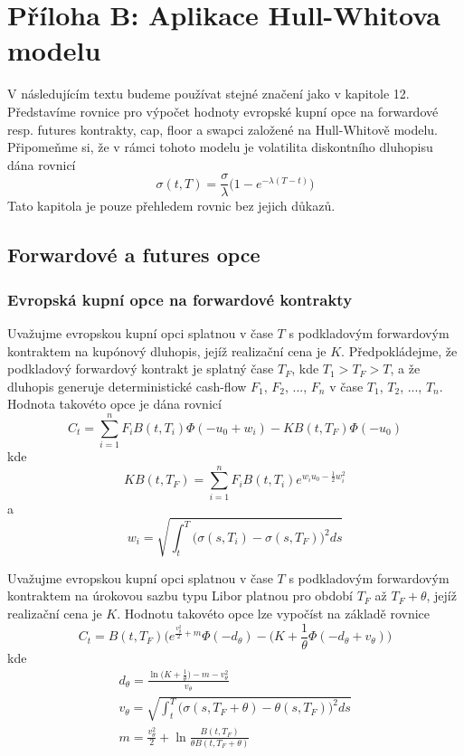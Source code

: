 \documentclass[a4paper]{book}
\begin{document}
\section{Příloha B: Aplikace Hull-Whitova modelu}

V následujícím textu budeme používat stejné značení jako v kapitole 12. Představíme rovnice pro výpočet hodnoty evropské kupní opce na forwardové resp. futures kontrakty, cap, floor a swapci založené na Hull-Whitově modelu. Připomeňme si, že v rámci tohoto modelu je volatilita diskontního dluhopisu dána rovnicí 
\begin{equation*}
\sigma(t,T) = \frac{\sigma}{\lambda} \big( 1 - e^{-\lambda(T-t)}\big)
\end{equation*}
Tato kapitola je pouze přehledem rovnic bez jejich důkazů.

\subsection{Forwardové a futures opce}

\subsubsection{Evropská kupní opce na forwardové kontrakty}

Uvažujme evropskou kupní opci splatnou v čase $T$ s podkladovým forwardovým kontraktem na kupónový dluhopis, jejíž realizační cena je $K$. Předpokládejme, že podkladový forwardový kontrakt je splatný čase $T_F$, kde $T_1 > T_F > T$, a že dluhopis generuje deterministické cash-flow $F_1$, $F_2$, ..., $F_n$ v čase $T_1$, $T_2$, ..., $T_n$. Hodnota takovéto opce je dána rovnicí
\begin{equation*}
C_t = \sum_{i=1}^n F_i B(t, T_i) \Phi(-u_0 + w_i) - KB(t, T_F)\Phi(-u_0)
\end{equation*}
kde
\begin{equation*}
KB(t, T_F) = \sum_{i=1}^n F_i B(t, T_i)e^{w_iu_0 - \frac{1}{2}w_i^2}
\end{equation*}
a
\begin{equation*}
w_i = \sqrt{\int_t^T \big(\sigma(s,T_i) - \sigma(s, T_F)\big)^2 ds}
\end{equation*}

Uvažujme evropskou kupní opci splatnou v čase $T$ s podkladovým forwardovým kontraktem na úrokovou sazbu typu Libor platnou pro období $T_F$ až $T_F + \theta$, jejíž realizační cena je $K$. Hodnotu takovéto opce lze vypočíst na základě rovnice
\begin{equation*}
C_t = B(t, T_F)\Bigg( e^{\frac{v_{\theta}^2}{2} + m}\Phi(-d_{\theta}) - \Big(K + \frac{1}{\theta}\Phi(-d_{\theta} + v_{\theta}) \Bigg)
\end{equation*}
kde
\begin{gather*}
d_{\theta} = \frac{\ln \Big( K + \frac{1}{\theta} \Big) - m - v_{\theta}^2}{v_{\theta}}\\
v_{\theta} = \sqrt{\int_t^T \big( \sigma(s, T_F + \theta) - \theta(s, T_F)\big)^2 ds}\\
m = \frac{v_{\theta}^2}{2} + \ln \frac{B(t, T_F)}{\theta B(t, T_F + \theta)}
\end{gather*}
\end{document}
